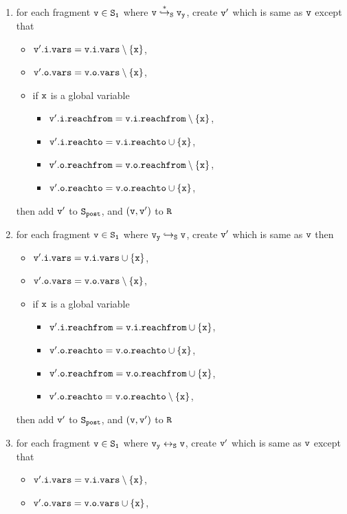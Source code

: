 \begin{itemize}
\begin{enumerate}
\item  for each fragment $\tt v \in S_1$ where $\tt v \overset{*}\hookrightarrow_S v_y$, create $\tt v'$ which is same as $\tt v$ except that
\begin{itemize}
\item $\tt v'.i.vars = v.i.vars \setminus \{x\}$,
\item $\tt v'.o.vars = v.o.vars \setminus \{x\}$,
\item if $\tt x$ is a global variable
\begin{itemize}
\item $\tt v'.i.reachfrom = v.i.reachfrom \setminus \{x\}$,
\item $\tt v'.i.reachto = v.i.reachto \cup \{x\}$,
\item $\tt v'.o.reachfrom = v.o.reachfrom \setminus \{x\}$,
\item $\tt v'.o.reachto = v.o.reachto \cup \{x\}$,
\end{itemize}
\end{itemize}
then add $\tt v'$ to $\tt S_{post}$, and $\tt (v,v')$ to $\tt R$
\item for each fragment $\tt v \in S_1$ where $\tt v_y \hookrightarrow_S v$, create $\tt v'$ which is same as $\tt v$ then
\begin{itemize}
\item $\tt v'.i.vars = v.i.vars \cup \{x\}$,
\item $\tt v'.o.vars = v.o.vars \setminus \{x\}$,
\item if $\tt x$ is a global variable
\begin{itemize}
\item $\tt v'.i.reachfrom = v.i.reachfrom \cup \{x\}$,
 \item $\tt v'.o.reachto = v.o.reachto \cup \{x\}$,
 \item $\tt v'.o.reachfrom = v.o.reachfrom \cup \{x\}$,
 \item $\tt v'.o.reachto = v.o.reachto \setminus \{x\}$,
\end{itemize}
\end{itemize}
then add $\tt v'$ to $\tt S_{post}$, and $\tt (v,v')$ to $\tt R$
\item for each fragment $\tt v \in S_1$ where $\tt v_y \leftrightarrow_S v$, create $\tt v'$ which is same as $\tt v$ except that
\begin{itemize} 
\item $\tt v'.i.vars = v.i.vars \setminus \{x\}$,
\item $\tt v'.o.vars = v.o.vars \cup \{x\}$,

\end{itemize}
\end{enumerate}
\end{itemize}
